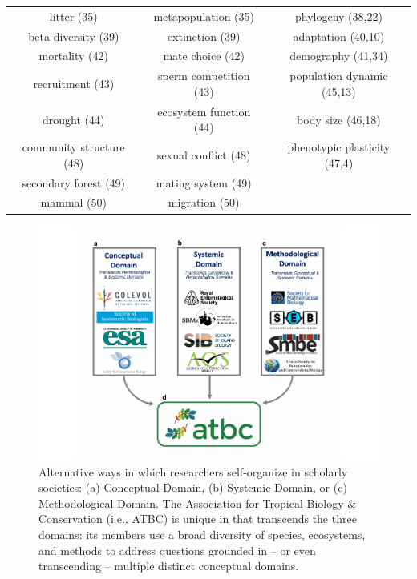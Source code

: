 \documentclass[
  12pt,
  man, donotrepeattitle,floatsintext]{apa6}
\begin{document}
\begin{table}
{\begin{tabular}[t]{ccc}
litter (35) & metapopulation (35) & phylogeny (38,22)\\
beta diversity (39) & extinction (39) & adaptation (40,10)\\
mortality (42) & mate choice (42) & demography (41,34)\\
recruitment (43) & sperm competition (43) & population dynamic (45,13)\\
drought (44) & ecosystem function (44) & body size (46,18)\\
community structure (48) & sexual conflict (48) & phenotypic plasticity (47,4)\\
secondary forest (49) & mating system (49) & \\
mammal (50) & migration (50) & \\
\bottomrule
\end{tabular}}
\end{table}

\begin{figure}[H]

{\centering \includegraphics[width=1\linewidth,height=0.9\textheight,]{Bruna_plenary_MS_files/figure-latex/fig-org-1} 

}

\caption{Alternative ways in which researchers self-organize in scholarly societies: (a) Conceptual Domain, (b) Systemic Domain, or (c) Methodological Domain. The Association for Tropical Biology \& Conservation (i.e., ATBC) is unique in that transcends the three domains: its members use a broad diversity of species, ecosystems, and methods to address questions grounded in -- or even transcending -- multiple distinct conceptual domains.}\label{fig:fig-org}
\end{figure}
\end{document}
